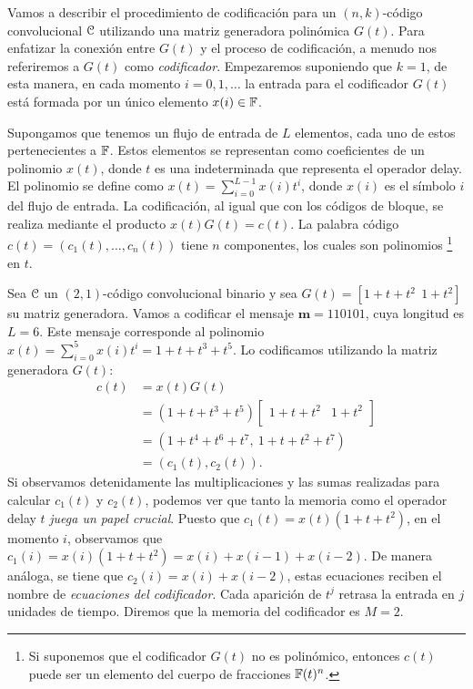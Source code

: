 Vamos a describir el procedimiento de codificación para un $(n,k)$-código convolucional $\mathcal C$ utilizando una matriz generadora polinómica $G(t)$. Para enfatizar la conexión entre $G(t)$ y el proceso de codificación, a menudo nos referiremos a $G(t)$ como \emph{codificador}. Empezaremos suponiendo que $k = 1$, de esta manera, en cada momento $i = 0,1,\dots$ la entrada para el codificador $G(t)$ está formada por un único elemento $x(i) \in \mathbb{F}$. 

Supongamos que tenemos un flujo de entrada de $L$ elementos, cada uno de estos pertenecientes a $\mathbb{F}$. Estos elementos se representan como coeficientes de un polinomio $x(t)$, donde $t$ es una indeterminada que representa el operador delay. El polinomio se define como $x(t) = \sum_{i=0}^{L-1}x(i)t^i$, donde $x(i)$ es el símbolo $i$ del flujo de entrada. La codificación, al igual que con los códigos de bloque, se realiza mediante el producto $x(t)G(t) = c(t)$. La palabra código $c(t) = (c_1(t),\dots,c_n(t))$ tiene $n$ componentes, los cuales son polinomios \footnote{ Si suponemos que el codificador $G(t)$ no es polinómico, entonces $c(t)$ puede ser un elemento del cuerpo de fracciones $\mathbb{F}(t)^n$. } en $t$.

\begin{ejemplo}
Sea $\mathcal C$ un $(2,1)$-código convolucional binario y sea $G(t) = \left[ 1 + t + t^2 \ \ 1 + t^2 \right]$ su matriz generadora. Vamos a codificar el mensaje $\mathbf{m} = 110101$, cuya longitud es $L = 6$. Este mensaje corresponde al polinomio $x(t) =  \sum_{i=0}^{5}x(i)t^i = 1 + t + t^3 + t^5$. Lo codificamos utilizando la matriz generadora $G(t)$:
\begin{align*}
    c(t) &= x(t)G(t) \\
    &= (1 + t + t^3 + t^5)\left[ \begin{array}{cc}
    1 + t + t^2 & 1 + t^2 \\
    \end{array} \right] \\
    &= \left(1 + t^4 + t^6 + t^7, \ 1 + t + t^2 + t^7\right) \\
    &= (c_1(t), c_2(t)).
\end{align*}
Si observamos detenidamente las multiplicaciones y las sumas realizadas para calcular $c_1(t)$ y $c_2(t)$, podemos ver que tanto la memoria como el operador delay $t$ \emph{juega un papel crucial}. Puesto que $c_1(t) = x(t)(1 + t + t^2)$, en el momento $i$, observamos que $c_1(i) = x(i)(1 + t + t^2) = x(i) + x(i-1) + x(i-2)$. De manera análoga, se tiene que $c_2(i) = x(i) + x(i-2)$, estas ecuaciones reciben el nombre de \emph{ecuaciones del codificador}. Cada aparición de $t^j$ retrasa la entrada en $j$ unidades de tiempo. Diremos que la memoria del codificador es $M = 2$.
\end{ejemplo}

